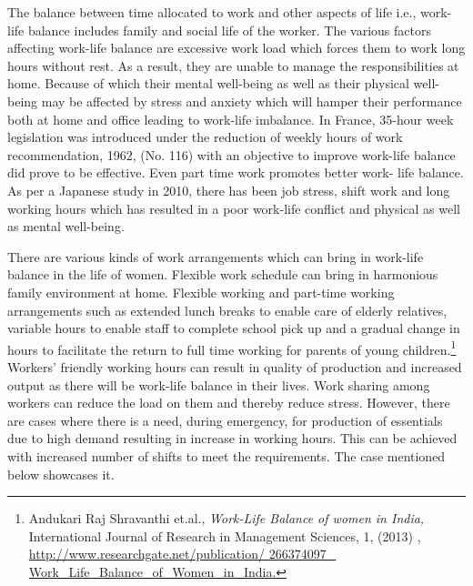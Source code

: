 \begin{multicols}{2}
\vspace{-.1cm}


\vspace{-.1cm}

\noi
The balance between time allocated to work and other aspects of life i.e., work-life balance
includes family and social life of the worker. The various factors affecting work-life balance
are excessive work load which forces them to work long hours without rest. As a result, they
are unable to manage the responsibilities at home. Because of which their mental well-being
as well as their physical well-being may be affected by stress and anxiety which will hamper
their performance both at home and office leading to work-life imbalance. In France, 35-hour
week legislation was introduced under the reduction of weekly hours of work
recommendation, 1962, (No. 116) with an objective to improve work-life balance did prove
to be effective. Even part time work promotes better work- life balance. As per a Japanese
study in 2010, there has been job stress, shift work and long working hours which has
resulted in a poor work-life conflict and physical as well as mental well-being.

\vspace{-.1cm}

\noi
There are various kinds of work arrangements which can bring in work-life balance in the life
of women. Flexible work schedule can bring in harmonious family environment at home.
Flexible working and part-time working arrangements such as extended lunch breaks to
enable care of elderly relatives, variable hours to enable staff to complete school pick up and
a gradual change in hours to facilitate the return to full time working for parents of young
children.\footnote{Andukari Raj Shravanthi et.al., \textit{Work-Life Balance of women in India,} International Journal of Research in
Management Sciences, 1, (2013) , \url{http://www.researchgate.net/publication/ 266374097_
Work_Life_Balance_of_Women_in_India.}} Workers’ friendly working hours can result in quality of production and increased
output as there will be work-life balance in their lives. Work sharing among workers can
reduce the load on them and thereby reduce stress. However, there are cases where there is a
need, during emergency, for production of essentials due to high demand resulting in increase
in working hours. This can be achieved with increased number of shifts to meet the
requirements. The case mentioned below showcases it.


\end{multicols}
